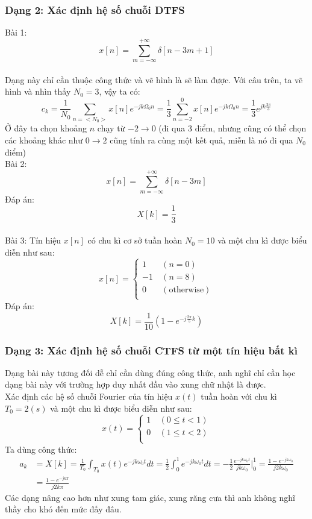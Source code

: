 \documentclass{article}
\begin{document}
\subsubsection{Dạng 2: Xác định hệ số chuỗi DTFS}
Bài 1: $$x[n]=\sum_{m=-\infty}^{+\infty}\delta{[n-3m+1]}$$
\\Dạng này chỉ cần thuộc công thức và vẽ hình là sẽ làm được. Với câu trên, ta vẽ hình và nhìn thấy $N_{0}=3$, vậy ta có:
$$c_{k}=\frac{1}{N_{0}}\sum_{n=<N_{0}>}x[n]e^{-jk\Omega_{0}n}=\frac{1}{3}\sum_{n=-2}^{0}x[n]e^{-jk\Omega_{0}n}=\frac{1}{3}e^{jk\frac{2\pi}{3}}$$
Ở đây ta chọn khoảng $n$ chạy từ $-2\to0$ (đi qua $3$ điểm, nhưng cũng có thể chọn các khoảng khác như $0\to 2$ cũng tính ra cùng một kết quả, miễn là nó đi qua $N_{0}$ điểm)
\\Bài 2: $$x[n]=\sum_{m=-\infty}^{+\infty}\delta{[n-3m]}$$
Đáp án: $$X[k]=\frac{1}{3}$$
\\ Bài 3: Tín hiệu $x[n]$ có chu kì cơ sở tuần hoàn $N_{0}=10$ và một chu kì được biểu diễn như sau:
\begin{equation*}
    x[n]=
    \begin{cases}
        1 &\ (n=0)\\
        -1  &\ (n=8)\\
        0 &\ (\text{otherwise})\\
    \end{cases}
\end{equation*}
Đáp án:
$$X[k]=\frac{1}{10}\left(1-e^{-j\frac{2\pi}{5}k}\right)$$
\subsubsection{Dạng 3: Xác định hệ số chuỗi CTFS từ một tín hiệu bất kì}
Dạng bài này tương đối dễ chỉ cần dùng đúng công thức, anh nghĩ chỉ cần học dạng bài này với trường hợp duy nhất đầu vào xung chữ nhật là được. 
\\ Xác định các hệ số chuỗi Fourier của tín hiệu $x(t)$ tuần hoàn với chu kì $T_{0}=2(s)$ và một chu kì được biểu diễn như sau:
\begin{equation*}
    x(t)=
    \begin{cases}
        1 &\ (0\leq t<1)\\ 0 &\ (1\leq t <2) \\
    \end{cases}
\end{equation*}
Ta dùng công thức:
\begin{equation*}
    \begin{split}
    a_{k}&=X[k]=\frac{1}{T_{0}}\int_{T_{0}}x(t)e^{-jk\omega_{0}t}dt=\frac{1}{2}\int_{0}^{1}e^{-jk\omega_{0}t}dt=-\frac{1}{2}\frac{e^{-jk\omega_{0}t}}{jk\omega_{0}}\Big|_0^1=\frac{1-e^{-jk\omega_{0}}}{j2k\omega_{0}}\\&=\frac{1-e^{-jk\pi}}{j2k\pi}
    \end{split}
\end{equation*}
Các dạng nâng cao hơn như xung tam giác, xung răng cưa thì anh không nghĩ thầy cho khó đến mức đấy đâu.
\end{document}
